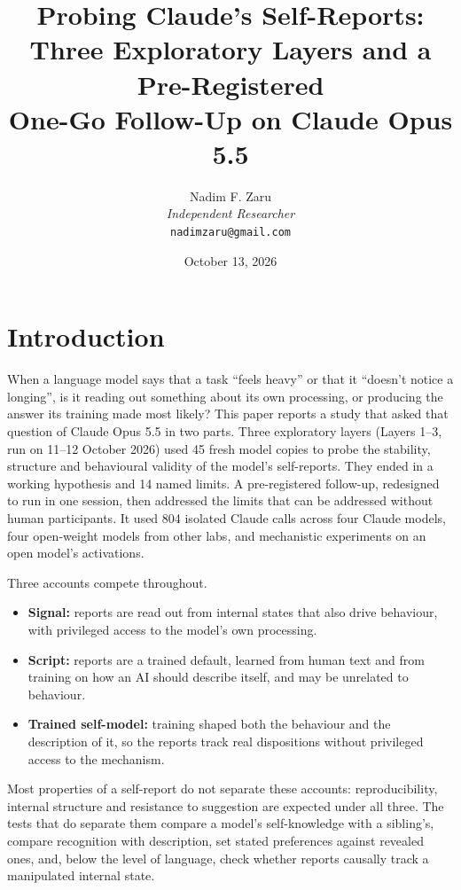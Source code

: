 \documentclass[11pt]{article}
\title{%
  \textbf{Probing Claude's Self-Reports: \\
  Three Exploratory Layers and a Pre-Registered \\
  One-Go Follow-Up on Claude Opus 5.5}
}
\author{
  Nadim F. Zaru \\
  \textit{Independent Researcher} \\
  \texttt{nadimzaru@gmail.com}
}
\date{October 13, 2026}
\begin{document}
\maketitle



\section{Introduction}

When a language model says that a task ``feels heavy'' or that it ``doesn't notice a longing'', is it reading out
something about its own processing, or producing the answer its training made most likely? This paper reports a
study that asked that question of Claude Opus 5.5 in two parts. Three exploratory layers (Layers 1--3, run on 11--12
October 2026) used 45 fresh model copies to probe the stability, structure and behavioural validity of the model's
self-reports. They ended in a working hypothesis and 14 named limits. A pre-registered follow-up, redesigned to run
in one session, then addressed the limits that can be addressed without human participants. It used 804
isolated Claude calls across four Claude models, four open-weight models from other labs, and mechanistic
experiments on an open model's activations.

Three accounts compete throughout.
\begin{itemize}
\item \textbf{Signal:} reports are read out from internal states that also drive behaviour, with privileged access
  to the model's own processing.
\item \textbf{Script:} reports are a trained default, learned from human text and from training on how an AI should
  describe itself, and may be unrelated to behaviour.
\item \textbf{Trained self-model:} training shaped both the behaviour and the description of it, so the reports track
  real dispositions without privileged access to the mechanism.
\end{itemize}
Most properties of a self-report do not separate these accounts: reproducibility, internal structure and resistance
to suggestion are expected under all three. The tests that do separate them compare a model's self-knowledge with a
sibling's, compare recognition with description, set stated preferences against revealed ones, and, below the
level of language, check whether reports causally track a manipulated internal state.
\end{document}
